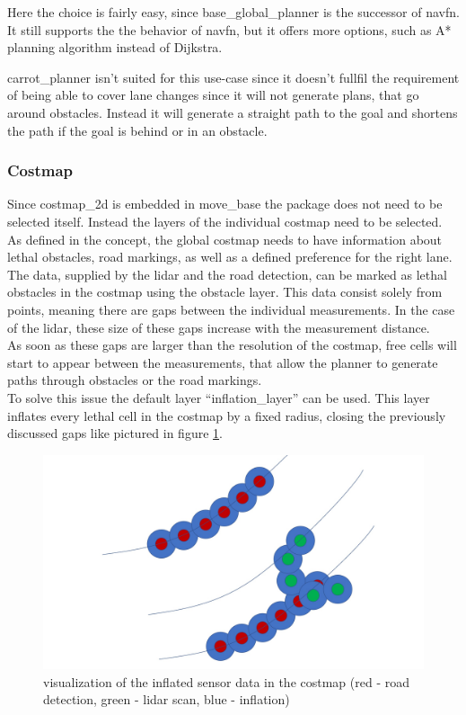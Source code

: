 Here the choice is fairly easy, since base\_global\_planner is the successor of navfn. It still supports the the behavior of navfn, but it offers more options, such as A* planning algorithm instead of Dijkstra.


carrot\_planner isn't suited for this use-case since it doesn't fullfil the requirement of being able to cover lane changes since it will not generate plans, that go around obstacles. Instead it will generate a straight path to the goal and shortens the path if the goal is behind or in an obstacle\cite{corrotplanner}.

\subsubsection{Costmap}
Since costmap\_2d is embedded in move\_base the package does not need to be selected itself. Instead the layers of the individual costmap need to be selected.\\

As defined in the concept, the global costmap needs to have information about lethal obstacles, road markings, as well as a defined preference for the right lane.\\


The data, supplied by the lidar and the road detection, can be marked as lethal obstacles in the costmap using the obstacle layer. This data consist solely from points, meaning there are gaps between the individual measurements. In the case of the lidar, these size of these gaps increase with the measurement distance.\\

As soon as these gaps are larger than the resolution of the costmap, free cells will start to appear between the measurements, that allow the planner to generate paths through obstacles or the road markings.\\

To solve this issue the default layer ``inflation\_layer'' can be used. This layer inflates every lethal cell in the costmap by a fixed radius, closing the previously discussed gaps like pictured in figure \ref{costinfl}.\\

\begin{figure}[H]
	\centering
	\includegraphics[width=.7\textwidth]{Pictures/costmap inflation}
	\caption{visualization of the inflated sensor data in the costmap (red - road detection, green - lidar scan, blue - inflation)}
	\label{costinfl}
\end{figure}

